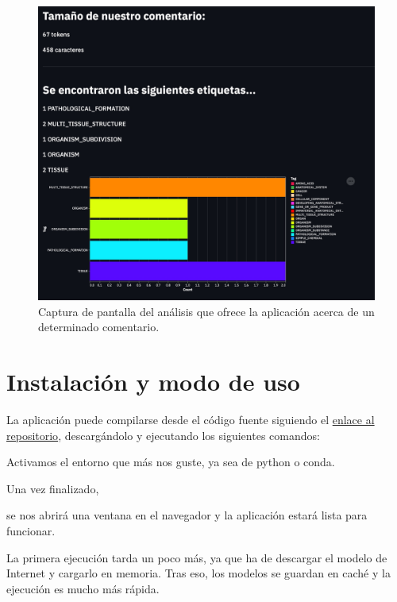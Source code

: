 \begin{figure}[h]
	\centering
	\includegraphics[width=.62\textwidth]{media/analysis_comment.jpeg}
	\caption{Captura de pantalla del análisis que ofrece la aplicación acerca de un determinado comentario.}
	\label{fig:analysis-comment}
\end{figure}



\section{Instalación y modo de uso}
La aplicación puede compilarse desde el código fuente siguiendo el \href{https://github.com/jesi-rgb/medical-text-analysis}{enlace al repositorio}, descargándolo y ejecutando los siguientes comandos:


Activamos el entorno que más nos guste, ya sea de python o conda.



Una vez finalizado, 


se nos abrirá una ventana en el navegador y la aplicación estará lista para funcionar.

La primera ejecución tarda un poco más, ya que ha de descargar el modelo de Internet y cargarlo en memoria. Tras eso, los modelos se guardan en caché y la ejecución es mucho más rápida.
